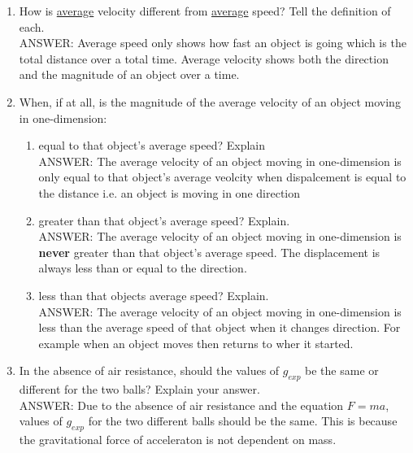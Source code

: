 \begin{enumerate}
  \item How is \underline{average} velocity different from \underline{average} speed? Tell the definition of each.\\
    ANSWER: Average speed only shows how fast an object is going which is the total distance over a total time.
    Average velocity shows both the direction and the magnitude of an object over a time.
  \item When, if at all, is the magnitude of the average velocity of an object moving in one-dimension:
  \begin{enumerate}
    \item equal to that object’s average speed? Explain\\
      ANSWER: The average velocity of an object moving in one-dimension is only equal to that object's
      average veolcity when dispalcement is equal to the distance i.e. an object is moving in one direction
    \item greater than that object’s average speed? Explain.\\
      ANSWER: The average velocity of an object moving in one-dimension is \textbf{never} greater than 
      that object's average speed. The displacement is always less than or equal to the direction.
    \item less than that objects average speed? Explain.\\
      ANSWER: The average velocity of an object moving in one-dimension is less than the average speed of
      that object when it changes direction. For example when an object moves then returns to wher it
      started.
  \end{enumerate}
\item In the absence of air resistance, should the values of $g_{exp}$ be the same or different for the two
    balls? Explain your answer.\\
    ANSWER: Due to the absence of air resistance and the equation $F=ma$, values of $g_{exp}$ for the two 
    different balls should be the same. This is because the gravitational force of acceleraton is not 
    dependent on mass.
\end{enumerate}
